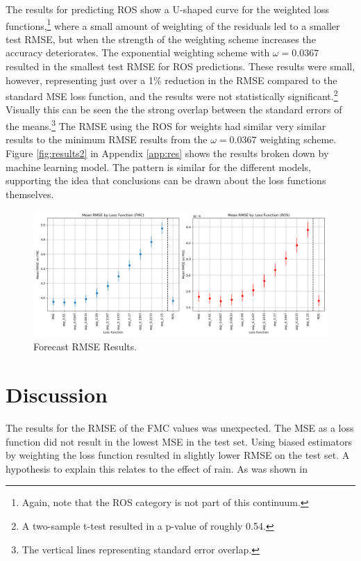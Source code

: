 \documentclass[11pt]{article}%
\begin{document}
The results for predicting ROS show a U-shaped curve for the weighted loss functions,\footnote{Again, note that the ROS category is not part of this continuum.} where a small amount of weighting of the residuals led to a smaller test RMSE, but when the strength of the weighting scheme increases the accuracy deteriorates. The exponential weighting scheme with $\omega = 0.0367$ resulted in the smallest test RMSE for ROS predictions. These results were small, however, representing just over a 1\% reduction in the RMSE compared to the standard MSE loss function, and the results were not statistically significant.\footnote{A two-sample t-test resulted in a p-value of roughly 0.54.} Visually this can be seen the the strong overlap between the standard errors of the means.\footnote{The vertical lines representing standard error overlap.} The RMSE using the ROS for weights had similar very similar results to the minimum RMSE results from the $\omega = 0.0367$ weighting scheme. Figure \ref{fig:results2} in Appendix \ref{app:res} shows the results broken down by machine learning model. The pattern is similar for the different models, supporting the idea that conclusions can be drawn about the loss functions themselves.

\begin{figure}[ht]
    \centering
    \includegraphics[width=1\textwidth]{images/results1.png}
    \caption{Forecast RMSE Results.}
    \label{fig:results1}
\end{figure}

\section{Discussion}

The results for the RMSE of the FMC values was unexpected. The MSE as a loss function did not result in the lowest MSE in the test set. Using biased estimators by weighting the loss function resulted in slightly lower RMSE on the test set. A hypothesis to explain this relates to the effect of rain. As was shown in 
\end{document}
